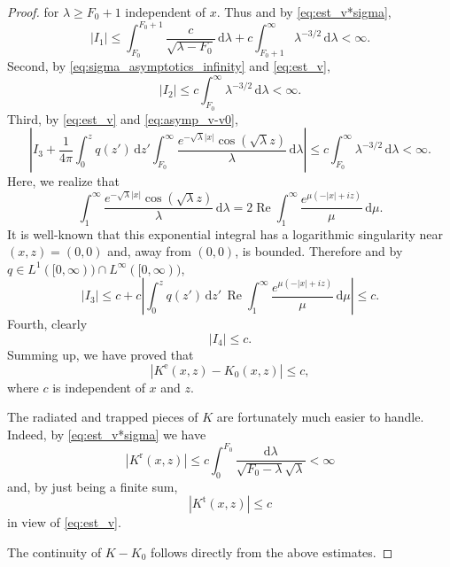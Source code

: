 \documentclass[11pt,twoside,reqno,centertags]{amsart}
\theoremstyle{definition}
\newcommand{\dd}{\mathrm d}
\DeclareMathOperator{\Real}{Re}
\begin{document}
\begin{proof}
	for $\lambda\ge F_0+1$ independent of $x$. Thus and by \eqref{eq:est_v*sigma},
	\[|I_1| \le \int_{F_0}^{F_0+1} \frac{c}{\sqrt{\lambda-F_0}}\,\dd\lambda + c\int_{F_0+1}^\infty \lambda^{-3/2} \,\dd\lambda < \infty.\]
	Second, by \eqref{eq:sigma_asymptotics_infinity} and \eqref{eq:est_v},
	\[|I_2| \le c \int_{F_0}^\infty \lambda^{-3/2}\,\dd\lambda < \infty.\]
	Third, by \eqref{eq:est_v} and \eqref{eq:asymp_v-v0},
	\[\left|I_3 + \frac{1}{4\pi} \int_0^z q(z')\,\dd z' \int_{F_0}^\infty \frac{e^{-\sqrt\lambda|x|} \cos(\sqrt\lambda z)}{\lambda} \,\dd\lambda\right| \le c \int_{F_0}^\infty \lambda^{-3/2}\,\dd\lambda < \infty.\]
	Here, we realize that
	\[\int_1^\infty \frac{e^{-\sqrt\lambda|x|} \cos(\sqrt\lambda z)}{\lambda} \,\dd\lambda = 2\Real \int_1^\infty \frac{e^{\mu(-|x|+iz)}}{\mu} \,\dd\mu.\]
	It is well-known that this exponential integral has a logarithmic singularity near $(x,z)=(0,0)$ and, away from $(0,0)$, is bounded. Therefore and by $q\in L^1([0,\infty))\cap L^\infty([0,\infty))$,
	\[|I_3| \le c + c\left|\int_0^z q(z')\,\dd z' \, \Real \int_1^\infty \frac{e^{\mu(-|x|+iz)}}{\mu} \,\dd\mu\right| \le c.\]
	Fourth, clearly
	\[|I_4| \le c.\]
	Summing up, we have proved that
	\[|K^{\mathrm{e}}(x,z) - K_0(x,z)| \le c,\]
	where $c$ is independent of $x$ and $z$.
	
	The radiated and trapped pieces of $K$ are fortunately much easier to handle. Indeed, by \eqref{eq:est_v*sigma} we have
	\[|K^{\mathrm{r}}(x,z)|\le c\int_0^{F_0} \frac{\dd\lambda}{\sqrt{F_0-\lambda} \sqrt\lambda} <\infty\]
	and, by just being a finite sum,
	\[|K^{\mathrm{t}}(x,z)|\le c\]
	in view of \eqref{eq:est_v}.
	
	The continuity of $K-K_0$ follows directly from the above estimates.
\end{proof}
\end{document}
